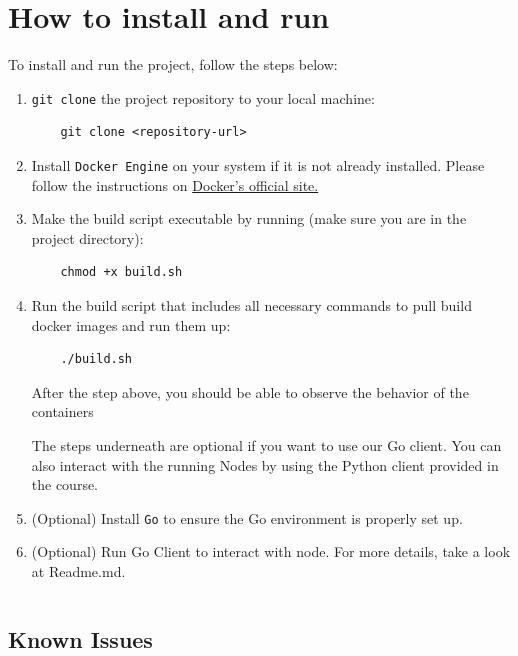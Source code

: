 \section{How to install and run}
To install and run the project, follow the steps below:

\begin{enumerate}
    \item \texttt{git clone} the project repository to your local machine:
    \begin{verbatim}
    git clone <repository-url>
    \end{verbatim}

    \item Install \texttt{Docker Engine} on your system if it is not already installed. Please follow the instructions on \href{https://docs.docker.com/}{Docker's official site.}

    \item Make the build script executable by running (make sure you are in the project directory):
    \begin{verbatim}
    chmod +x build.sh
    \end{verbatim}

    \item Run the build script that includes all necessary commands to pull build docker images and run them up:
    \begin{verbatim}
    ./build.sh
    \end{verbatim}

After the step above, you should be able to observe the behavior of the containers 

The steps underneath are optional if you want to use our Go client. You can also interact with the running Nodes by using the Python client provided in the course.

    \item (Optional) Install \texttt{Go} to ensure the Go environment is properly set up.

    \item (Optional) Run Go Client to interact with node. For more details, take a look at Readme.md.
    \begin{verbatim}

    \end{verbatim}
\end{enumerate}


\subsection{Known Issues}

